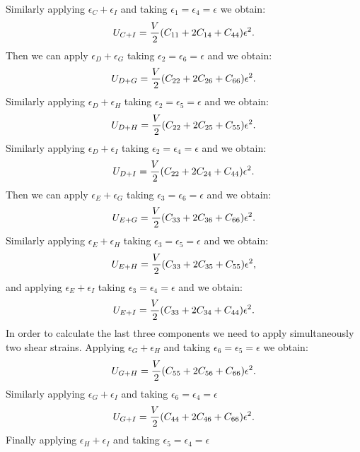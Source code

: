 \documentclass[12pt,a4paper,twoside]{report}
\begin{document}
Similarly applying $\epsilon_C + \epsilon_I$ and taking
$\epsilon_1=\epsilon_4=\epsilon$ we obtain:
\begin{equation}
U_{C+I}= {V \over 2} (C_{11}+2 C_{14} + C_{44}) \epsilon^2.
\end{equation}
Then we can apply $\epsilon_D + \epsilon_G$ taking
$\epsilon_2=\epsilon_6=\epsilon$ and we obtain:
\begin{equation}
U_{D+G}= {V \over 2} (C_{22}+2 C_{26} + C_{66}) \epsilon^2.
\end{equation}
Similarly applying $\epsilon_D + \epsilon_H$ taking
$\epsilon_2=\epsilon_5=\epsilon$ and we obtain:
\begin{equation}
U_{D+H}= {V \over 2} (C_{22}+2 C_{25} + C_{55}) \epsilon^2.
\end{equation}
Similarly applying $\epsilon_D + \epsilon_I$ taking
$\epsilon_2=\epsilon_4=\epsilon$ and we obtain:
\begin{equation}
U_{D+I}= {V \over 2} (C_{22}+2 C_{24} + C_{44}) \epsilon^2.
\end{equation}
Then we can apply $\epsilon_E + \epsilon_G$ taking
$\epsilon_3=\epsilon_6=\epsilon$ and we obtain:
\begin{equation}
U_{E+G}= {V \over 2} (C_{33}+2 C_{36} + C_{66}) \epsilon^2.
\end{equation}
Similarly applying $\epsilon_E + \epsilon_H$ taking
$\epsilon_3=\epsilon_5=\epsilon$ and we obtain:
\begin{equation}
U_{E+H}= {V \over 2} (C_{33}+2 C_{35} + C_{55}) \epsilon^2,
\end{equation}
and applying $\epsilon_E + \epsilon_I$ taking
$\epsilon_3=\epsilon_4=\epsilon$ and we obtain:
\begin{equation}
U_{E+I}= {V \over 2} (C_{33}+2 C_{34} + C_{44}) \epsilon^2.
\end{equation}
In order to calculate the last three components we need to apply
simultaneously two shear strains. Applying $\epsilon_G + \epsilon_H$ 
and taking $\epsilon_6=\epsilon_5=\epsilon$ we obtain:
\begin{equation}
U_{G+H}= {V \over 2} (C_{55}+2 C_{56} + C_{66}) \epsilon^2.
\end{equation}
Similarly applying $\epsilon_G + \epsilon_I$
and taking $\epsilon_6=\epsilon_4=\epsilon$
\begin{equation}
U_{G+I}= {V \over 2} (C_{44}+2 C_{46} + C_{66}) \epsilon^2.
\end{equation}
Finally applying $\epsilon_H + \epsilon_I$
and taking $\epsilon_5=\epsilon_4=\epsilon$
\end{document}
